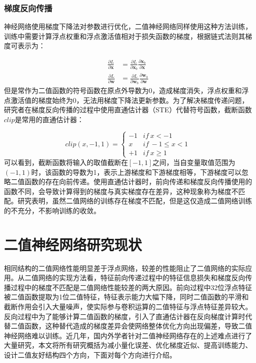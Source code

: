 \subsubsection{梯度反向传播}

神经网络使用梯度下降法对参数进行优化，二值神经网络同样使用这种方法训练，训练中需要计算浮点权重和浮点激活值相对于损失函数的梯度，根据链式法则其梯度可表示为：

\begin{align}
  \frac{\partial L}{\partial \bm{x}} & = \frac{\partial L}{\partial \bm{x}_b} \frac{\partial \bm{x}_b}{\partial \bm{x}} \\
  \frac{\partial L}{\partial \bm{w}} & = \frac{\partial L}{\partial \bm{w}_b} \frac{\partial \bm{w}_b}{\partial \bm{w}}
\end{align}
但是常作为二值函数的符号函数在原点外导数为0，造成梯度消失，浮点权重和浮点激活值的梯度始终为0，无法用梯度下降法更新参数。为了解决梯度传递问题，研究者在梯度反向传播的过程中使用直通估计器（STE）代替符号函数，截断函数$clip$是常用的直通估计器：

\begin{equation}
  \label{eq:clip}
  clip(x,-1,1) =
  \begin{cases}
    -1 & if \ x < -1 \\
    x & if \ -1 \leq x < 1 \\
    +1 & if \ x \geq 1
  \end{cases}
\end{equation}
可以看到，截断函数将输入的取值截断在$[-1, 1]$之间，当自变量取值范围为$(-1, 1)$时，该函数的导数为1，表示上游梯度和下游梯度相等，下游梯度可以忽略二值函数的存在向前传递。使用直通估计器时，前向传递和梯度反向传播使用的函数不同，会导致计算得到的梯度与真实梯度存在差异，这种现象称为梯度不匹配。研究表明\cite{xnornet}，虽然二值网络的训练存在梯度不匹配，但是这仅造成二值网络训练的不充分，不影响训练的收敛。

\section{二值神经网络研究现状}

相同结构的二值网络性能明显差于浮点网络，较差的性能阻止了二值网络的实际应用。从二值网络的实现方法看，特征前向传递过程中的特征信息损失和梯度反向传播过程中的梯度不匹配是二值网络性能较差的两大原因。前向过程中32位浮点特征被二值函数提取为1位二值特征，特征表示能力大幅下降，同时二值函数的平滑和截断作用会引入大量噪声，使实际参与卷积运算的二值特征与浮点特征差异较大。反向过程中为了能够计算二值函数的梯度，引入了直通估计器在反向梯度计算时代替二值函数，这种替代造成的梯度差异会使网络整体优化方向出现偏差，导致二值神经网络难以训练。近几年，国内外学者针对二值神经网络存在的上述难点进行了大量研究，本文将所有研究概括为减小量化误差、优化梯度近似、提高训练能力、设计二值友好结构四个方向，下面对每个方向进行介绍。

